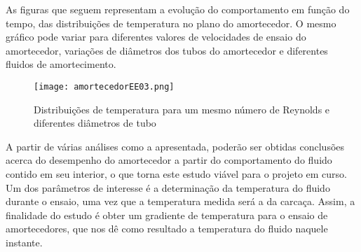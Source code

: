 	As figuras que seguem representam a evolução do comportamento em função do tempo, das distribuições de temperatura no plano do amortecedor. O mesmo gráfico pode variar para diferentes valores de velocidades de ensaio do amortecedor, variações de diâmetros dos tubos do amortecedor e diferentes fluidos de amortecimento.

	\begin{figure}[!h]
		\centering
		\texttt{[image: amortecedorEE03.png]}
		\caption[Distribuições de temperatura para um mesmo número de Reynolds e diferentes diâmetros de tubo]{Distribuições de temperatura para um mesmo número de Reynolds e diferentes diâmetros de tubo \cite{Neto}} 
		\label{amortecedorEE03}
	\end{figure}

	A partir de várias análises como a apresentada, poderão ser obtidas conclusões acerca do desempenho do amortecedor a partir do comportamento do fluido contido em seu interior, o que torna este estudo viável para o projeto em curso. Um dos parâmetros de interesse é a determinação da temperatura do fluido durante o ensaio, uma vez que a temperatura medida será a da carcaça. Assim, a finalidade do estudo é obter um gradiente de temperatura para o ensaio de amortecedores, que nos dê como resultado a temperatura do fluido naquele instante.

